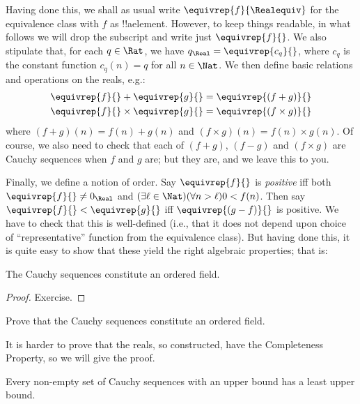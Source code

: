 \documentclass[../../../include/open-logic-section]{subfiles}
\begin{document}
Having done this, we shall as usual write $\equivrep{f}{\Realequiv}$
for the equivalence class with $f$ as !!a{element}. However, to keep
things readable, in what follows we will drop the subscript and write
just $\equivrep{f}{}$. We also stipulate that, for each $q \in \Rat$,
we have $q_{\Real} = \equivrep{c_{q}}{}$, where $c_{q}$ is the
constant function $c_q(n) = q$ for all $n \in \Nat$. We then define
basic relations and operations on the reals, e.g.:
\begin{align*}
	\equivrep{f}{} + \equivrep{g}{} &= 	\equivrep{(f + g)}{} \\
	\equivrep{f}{} \times 	\equivrep{g}{} &= \equivrep{(f \times g)}{} 
\end{align*}
where $(f + g)(n) = f(n) + g(n)$ and $(f \times g)(n) = f(n) \times
g(n)$. Of course, we also need to check that each of  $(f + g)$,
$(f-g)$ and $(f\times g)$ are Cauchy sequences when $f$ and $g$ are;
but they are, and we leave this to you.

Finally, we define a notion of order. Say $\equivrep{f}{}$ is
\emph{positive} iff both $\equivrep{f}{}\neq 0_\Real$ and $(\exists
\ell \in \Nat)(\forall n > \ell)0 < f(n)$. Then say $\equivrep{f}{} <
\equivrep{g}{}$ iff $\equivrep{(g - f)}{}$ is positive. We have to
check that this is well-defined (i.e., that it does not depend upon
choice of ``representative'' function from the equivalence class). 
But having done this, it is quite easy to show that these yield the
right algebraic properties; that is:
\begin{thm}
The Cauchy sequences constitute an ordered field.
\end{thm}

\begin{proof}
Exercise. 
\end{proof}

\begin{prob}
Prove that the Cauchy sequences constitute an ordered field.
\end{prob}

It is harder to prove that the reals, so constructed, have the
Completeness Property, so we will give the proof.

\begin{thm}
Every non-empty set of Cauchy sequences with an upper bound has a
least upper bound.
\end{thm}
\end{document}
